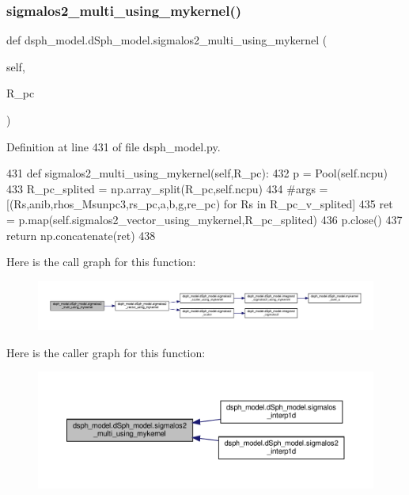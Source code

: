 \subsubsection{\texorpdfstring{sigmalos2\+\_\+multi\+\_\+using\+\_\+mykernel()}{sigmalos2\_multi\_using\_mykernel()}}
{\footnotesize\ttfamily def dsph\+\_\+model.\+d\+Sph\+\_\+model.\+sigmalos2\+\_\+multi\+\_\+using\+\_\+mykernel (\begin{DoxyParamCaption}\item[{}]{self,  }\item[{}]{R\+\_\+pc }\end{DoxyParamCaption})}



Definition at line 431 of file dsph\+\_\+model.\+py.


\begin{DoxyCode}
431     \textcolor{keyword}{def }sigmalos2\_multi\_using\_mykernel(self,R\_pc):
432         p = Pool(self.ncpu)
433         R\_pc\_splited = np.array\_split(R\_pc,self.ncpu)
434         \textcolor{comment}{#args = [(Rs,anib,rhos\_Msunpc3,rs\_pc,a,b,g,re\_pc) for Rs in R\_pc\_v\_splited]}
435         ret = p.map(self.sigmalos2\_vector\_using\_mykernel,R\_pc\_splited)
436         p.close()
437         \textcolor{keywordflow}{return} np.concatenate(ret)
438 
\end{DoxyCode}
Here is the call graph for this function\+:
\nopagebreak
\begin{figure}[H]
\begin{center}
\leavevmode
\includegraphics[width=350pt]{d0/d25/classdsph__model_1_1dSph__model_a0f0607e3d81520eb0c4c8b79dd871f0e_cgraph}
\end{center}
\end{figure}
Here is the caller graph for this function\+:
\nopagebreak
\begin{figure}[H]
\begin{center}
\leavevmode
\includegraphics[width=350pt]{d0/d25/classdsph__model_1_1dSph__model_a0f0607e3d81520eb0c4c8b79dd871f0e_icgraph}
\end{center}
\end{figure}
\mbox{\label{classdsph__model_1_1dSph__model_a05b988f7553121226a4d08369c44b4fa}} 
